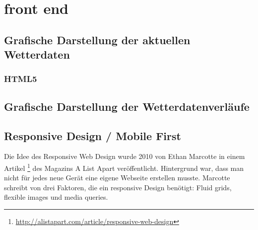 \section{front end}


\subsection{Grafische Darstellung der aktuellen Wetterdaten}

\subsubsection*{HTML5}





\subsection{Grafische Darstellung der Wetterdatenverläufe}




\subsection{Responsive Design / Mobile First}

Die Idee des Responsive Web Design wurde 2010 von Ethan Marcotte in einem Artikel \footnote{ \url{http://alistapart.com/article/responsive-web-design}} des Magazins A List Apart veröffentlicht. Hintergrund war, dass man nicht für jedes neue Gerät eine eigene Webseite erstellen musste. Marcotte schreibt von drei Faktoren, die ein responsive Design benötigt: Fluid grids, flexible images und media queries.

